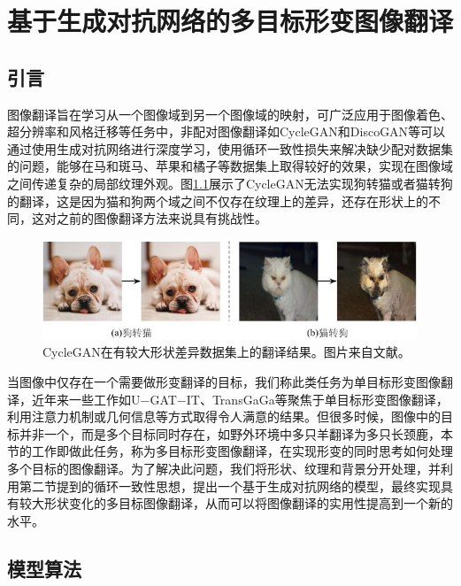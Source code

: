 \chapter{基于生成对抗网络的多目标形变图像翻译}

\section{引言}

图像翻译旨在学习从一个图像域到另一个图像域的映射，可广泛应用于图像着色、超分辨率和风格迁移等任务中，非配对图像翻译如CycleGAN\cite{zhu2017unpaired}和DiscoGAN\cite{kim2017learning}等可以通过使用生成对抗网络进行深度学习，使用循环一致性损失来解决缺少配对数据集的问题，能够在马和斑马、苹果和橘子等数据集上取得较好的效果，实现在图像域之间传递复杂的局部纹理外观。图\ref{fig:cyclegan_failure}展示了CycleGAN无法实现狗转猫或者猫转狗的翻译，这是因为猫和狗两个域之间不仅存在纹理上的差异，还存在形状上的不同，这对之前的图像翻译方法来说具有挑战性。

\begin{figure}[ht]
    \centering
	\includegraphics[width=\textwidth]{figs/cyclegan_failure.pdf}
	\caption{CycleGAN在有较大形状差异数据集上的翻译结果。图片来自文献\cite{zhu2017unpaired}。}
	\label{fig:cyclegan_failure}
\end{figure}

当图像中仅存在一个需要做形变翻译的目标，我们称此类任务为单目标形变图像翻译，近年来一些工作如U$-$GAT$-$IT\cite{kim2019u}、TransGaGa\cite{wu2019transgaga}等聚焦于单目标形变图像翻译，利用注意力机制或几何信息等方式取得令人满意的结果。但很多时候，图像中的目标并非一个，而是多个目标同时存在，如野外环境中多只羊翻译为多只长颈鹿，本节的工作即做此任务，称为多目标形变图像翻译，在实现形变的同时思考如何处理多个目标的图像翻译。为了解决此问题，我们将形状、纹理和背景分开处理，并利用第二节提到的循环一致性思想，提出一个基于生成对抗网络的模型，最终实现具有较大形状变化的多目标图像翻译，从而可以将图像翻译的实用性提高到一个新的水平。

\section{模型算法}

